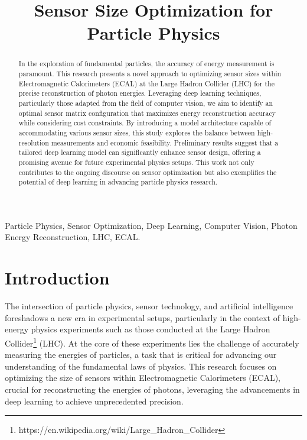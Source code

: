 \documentclass[conference]{IEEEtran}
\begin{document}
\title{Sensor Size Optimization for Particle Physics
}

\author{
}

\maketitle
\begin{abstract}
    In the exploration of fundamental particles, the accuracy of energy measurement is paramount. This research presents a novel approach to optimizing sensor sizes within Electromagnetic Calorimeters (ECAL) at the Large Hadron Collider (LHC) for the precise reconstruction of photon energies. Leveraging deep learning techniques, particularly those adapted from the field of computer vision, we aim to identify an optimal sensor matrix configuration that maximizes energy reconstruction accuracy while considering cost constraints. By introducing a model architecture capable of accommodating various sensor sizes, this study explores the balance between high-resolution measurements and economic feasibility. Preliminary results suggest that a tailored deep learning model can significantly enhance sensor design, offering a promising avenue for future experimental physics setups. This work not only contributes to the ongoing discourse on sensor optimization but also exemplifies the potential of deep learning in advancing particle physics research.
\end{abstract}

\begin{IEEEkeywords}
    Particle Physics, Sensor Optimization, Deep Learning, Computer Vision, Photon Energy Reconstruction, LHC, ECAL.
\end{IEEEkeywords}

\section{Introduction}

The intersection of particle physics, sensor technology, and artificial intelligence foreshadows a new era in experimental setups, particularly in the context of high-energy physics experiments such as those conducted at the Large Hadron Collider\footnote{https://en.wikipedia.org/wiki/Large\_Hadron\_Collider} (LHC). At the core of these experiments lies the challenge of accurately measuring the energies of particles, a task that is critical for advancing our understanding of the fundamental laws of physics. This research focuses on optimizing the size of sensors within Electromagnetic Calorimeters (ECAL), crucial for reconstructing the energies of photons, leveraging the advancements in deep learning to achieve unprecedented precision.
\end{document}

